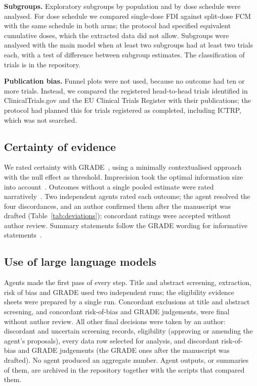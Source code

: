 \documentclass[11pt,a4paper]{article}
\begin{document}
\textbf{Subgroups.} Exploratory subgroups by population and by dose schedule were analysed. For dose schedule we compared single-dose FDI against split-dose FCM with the same schedule in both arms; the protocol had specified equivalent cumulative doses, which the extracted data did not allow. Subgroups were analysed with the main model when at least two subgroups had at least two trials each, with a test of difference between subgroup estimates. The classification of trials is in the repository.

\textbf{Publication bias.} Funnel plots were not used, because no outcome had ten or more trials. Instead, we compared the registered head-to-head trials identified in ClinicalTrials.gov and the EU Clinical Trials Register with their publications; the protocol had planned this for trials registered as completed, including ICTRP, which was not searched.

\subsection{Certainty of evidence}
We rated certainty with GRADE~\cite{Guyatt2008}, using a minimally contextualised approach with the null effect as threshold. Imprecision took the optimal information size into account~\cite{Guyatt2011imprecision}. Outcomes without a single pooled estimate were rated narratively~\cite{Murad2017}. Two independent agents rated each outcome; the agent resolved the four discordances, and an author confirmed them after the manuscript was drafted (Table~\ref{tab:deviations}); concordant ratings were accepted without author review. Summary statements follow the GRADE wording for informative statements~\cite{Santesso2020}.

\subsection{Use of large language models}
Agents made the first pass of every step. Title and abstract screening, extraction, risk of bias and GRADE used two independent runs; the eligibility evidence sheets were prepared by a single run. Concordant exclusions at title and abstract screening, and concordant risk-of-bias and GRADE judgements, were final without author review. All other final decisions were taken by an author: discordant and uncertain screening records, eligibility (approving or amending the agent's proposals), every data row selected for analysis, and discordant risk-of-bias and GRADE judgements (the GRADE ones after the manuscript was drafted). No agent produced an aggregate number. Agent outputs, or summaries of them, are archived in the repository together with the scripts that compared them.
\end{document}
